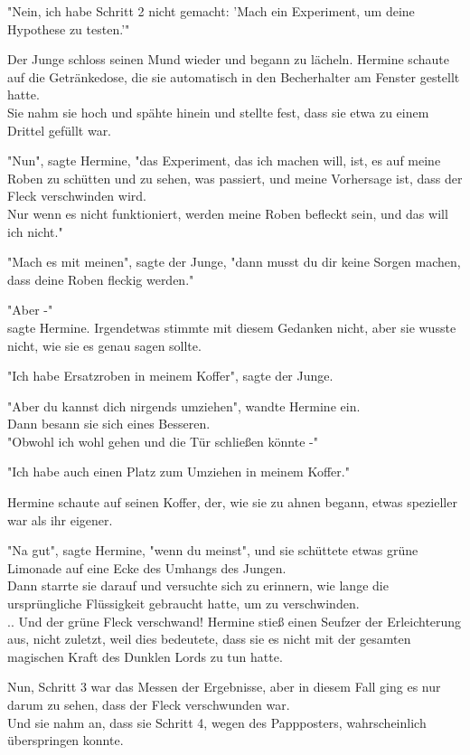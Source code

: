 {"Nein, ich habe Schritt 2 nicht gemacht: 'Mach ein Experiment, um deine Hypothese zu testen.'"

Der Junge schloss seinen Mund wieder und begann zu lächeln. Hermine schaute auf die Getränkedose, die sie automatisch in den Becherhalter am Fenster gestellt hatte.\\ Sie nahm sie hoch und spähte hinein und stellte fest, dass sie etwa zu einem Drittel gefüllt war.

"Nun", sagte Hermine, "das Experiment, das ich machen will, ist, es auf meine Roben zu schütten und zu sehen, was passiert, und meine Vorhersage ist, dass der Fleck verschwinden wird.\\ Nur wenn es nicht funktioniert, werden meine Roben befleckt sein, und das will ich nicht."

"Mach es mit meinen", sagte der Junge, "dann musst du dir keine Sorgen machen, dass deine Roben fleckig werden."

"Aber -"\\ sagte Hermine. Irgendetwas stimmte mit diesem Gedanken nicht, aber sie wusste nicht, wie sie es genau sagen sollte.

"Ich habe Ersatzroben in meinem Koffer", sagte der Junge.

"Aber du kannst dich nirgends umziehen", wandte Hermine ein.\\ Dann besann sie sich eines Besseren.\\ "Obwohl ich wohl gehen und die Tür schließen könnte -"

"Ich habe auch einen Platz zum Umziehen in meinem Koffer."

Hermine schaute auf seinen Koffer, der, wie sie zu ahnen begann, etwas spezieller war als ihr eigener.

"Na gut", sagte Hermine, "wenn du meinst", und sie schüttete etwas grüne Limonade auf eine Ecke des Umhangs des Jungen.\\ Dann starrte sie darauf und versuchte sich zu erinnern, wie lange die ursprüngliche Flüssigkeit gebraucht hatte, um zu verschwinden.\\ .. Und der grüne Fleck verschwand! Hermine stieß einen Seufzer der Erleichterung aus, nicht zuletzt, weil dies bedeutete, dass sie es nicht mit der gesamten magischen Kraft des Dunklen Lords zu tun hatte.

Nun, Schritt 3 war das Messen der Ergebnisse, aber in diesem Fall ging es nur darum zu sehen, dass der Fleck verschwunden war.\\ Und sie nahm an, dass sie Schritt 4, wegen des Pappposters, wahrscheinlich überspringen konnte.

}
